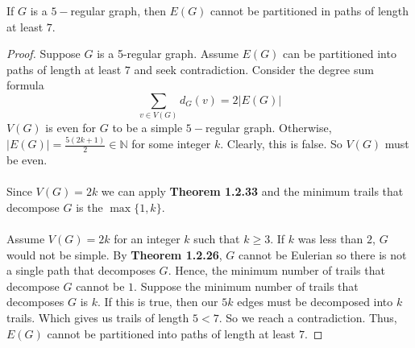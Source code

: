 \documentclass{article}
\newcommand{\N}{\mathbb{N}}
\newenvironment{claim}[2][Claim]{\begin{trivlist}
		\item[\hskip \labelsep {\bfseries #1}\hskip \labelsep {\bfseries #2}]}{\end{trivlist}}
\begin{document}
\begin{claim}{3}
	If $G$ is a $5-$regular graph, then $E(G)$ cannot be partitioned in paths of length at least $7$.
\end{claim}
\begin{proof}
	Suppose $G$ is a 5-regular graph. Assume $E(G)$ can be partitioned into paths of length at least $7$ and seek contradiction. Consider the degree sum formula \[ \sum_{v \in V(G)} d_G(v) = 2 |E(G)|\]
	$V(G)$ is even for $G$ to be a simple $5-$regular graph. Otherwise, $|E(G)| = \frac{5(2k + 1)}{2} \in \N$ for some integer $k$. Clearly, this is false. So $V(G)$ must be even. \\ \\
	Since $V(G) = 2k$ we can apply \textbf{Theorem 1.2.33} and the minimum trails that decompose $G$ is the $\max\{1,k\}$.\\ \\
	Assume $V(G) = 2k$ for an integer $k$ such that $k \geq 3$. If $k$ was less than $2$, $G$ would not be simple. By \textbf{Theorem 1.2.26}, $G$ cannot be Eulerian so there is not a single path that decomposes $G$. Hence, the minimum number of trails that decompose $G$ cannot be $1$. Suppose the minimum number of trails that decomposes $G$ is $k$. If this is true, then our $5k$ edges must be decomposed into $k$ trails. Which gives us trails of length $5 < 7$. So we reach a contradiction. Thus, $E(G)$ cannot be partitioned into paths of length at least $7$.   
\end{proof}
\end{document}
